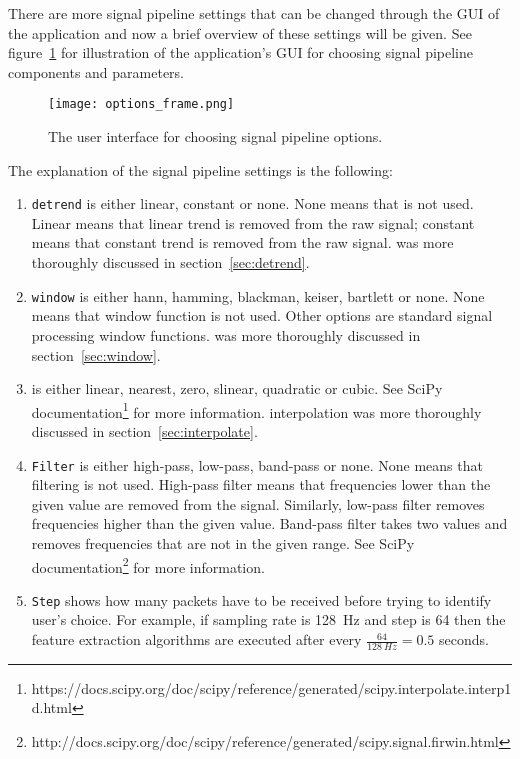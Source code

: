 There are more signal pipeline settings that can be changed through the \gls{GUI} of the application and now a brief overview of these settings will be given. See figure~\ref{fig:options_frame} for illustration of the application's \gls{GUI} for choosing signal pipeline components and parameters.

\begin{figure}[h]
	\centering
	\texttt{[image: options\_frame.png]}
	\caption{The user interface for choosing signal pipeline options.}
	\label{fig:options_frame}
\end{figure}

The explanation of the signal pipeline settings is the following:
\begin{enumerate}
	\item \texttt{\Gls{detrend}} is either linear, constant or none. None means that  is not used. Linear means that linear trend is removed from the raw signal; constant means that constant trend is removed from the raw signal.  was more thoroughly discussed in section~\ref{sec:detrend}.
	\item \texttt{\Gls{window}} is either hann, hamming, blackman, keiser, bartlett or none. None means that \gls{window} function is not used. Other options are standard signal processing \gls{window} functions.  was more thoroughly discussed in section~\ref{sec:window}.
	\item \texttt{} is either linear, nearest, zero, slinear, quadratic or cubic. See SciPy documentation\footnote{https://docs.scipy.org/doc/scipy/reference/generated/scipy.interpolate.interp1d.html} for more information. \Gls{interpolation} was more thoroughly discussed in section~\ref{sec:interpolate}.
	\item \texttt{Filter} is either high-pass, low-pass, band-pass or none. None means that filtering is not used. High-pass filter means that frequencies lower than the given value are removed from the signal. Similarly, low-pass filter removes frequencies higher than the given value. Band-pass filter takes two values and removes frequencies that are not in the given range. See SciPy documentation\footnote{http://docs.scipy.org/doc/scipy/reference/generated/scipy.signal.firwin.html} for more information. 
	\item \texttt{Step} shows how many packets have to be received before trying to identify user's choice. For example, if \gls{sampling rate} is \SI{128}{Hz} and step is 64 then the \gls{feature extraction} algorithms are executed after every $\frac{64}{\SI{128}{Hz}}=0.5$ seconds.

\end{enumerate}
